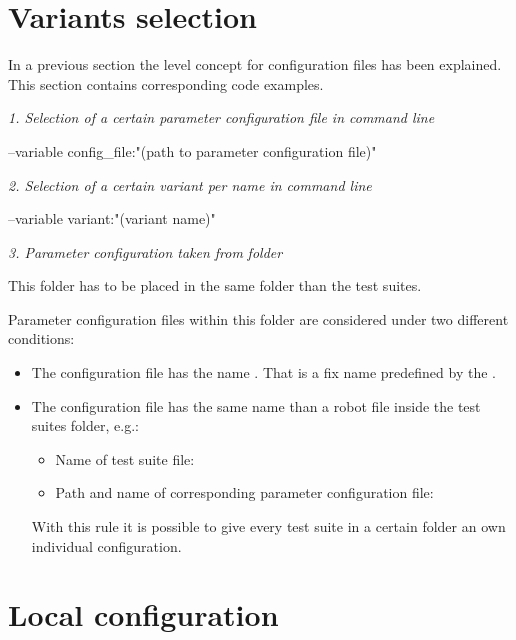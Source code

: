 \section{Variants selection}

In a previous section the level concept for configuration files has been explained. This section contains corresponding code examples.

\textit{1. Selection of a certain parameter configuration file in command line}

\begin{robotlog}
--variable config_file:"(path to parameter configuration file)"
\end{robotlog}

\textit{2. Selection of a certain variant per name in command line}

\begin{robotlog}
--variable variant:"(variant name)"
\end{robotlog}

\textit{3. Parameter configuration taken from}  \textit{folder}

This  folder has to be placed in the same folder than the test suites.

Parameter configuration files within this folder are considered under two different conditions:

\begin{itemize}
   \item The configuration file has the name . That is a fix name predefined by the \pkg.
   \item The configuration file has the same name than a robot file inside the test suites folder, e.g.:
         \begin{itemize}
            \item Name of test suite file: 
            \item Path and name of corresponding parameter configuration file: 
         \end{itemize}
         With this rule it is possible to give every test suite in a certain folder an own individual configuration.
\end{itemize}

\newpage

\section{Local configuration}

